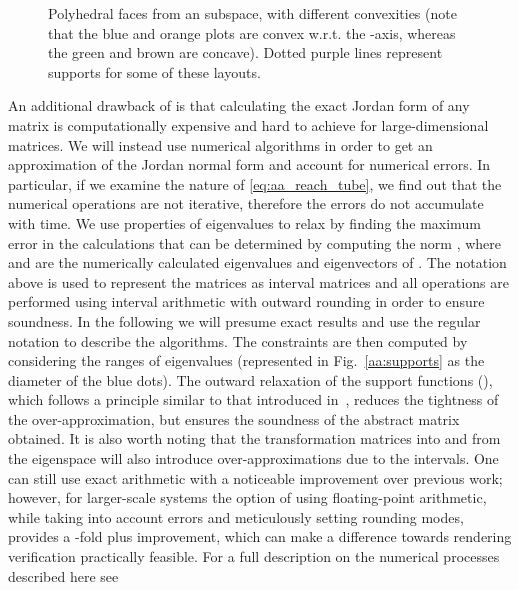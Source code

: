 \documentclass{IEEEtran}
\begin{document}
\begin{figure}[]
\caption{Polyhedral faces from an  subspace, with different convexities  
(note that the blue and orange plots are convex w.r.t. the -axis, whereas the green and brown are concave).
Dotted purple lines represent supports for some of these layouts.}
\label{aa:mixed_supports}
\end{figure}


An additional drawback of \cite{JSS14} is that calculating the exact
Jordan form of any matrix is computationally expensive and hard to
achieve for large-dimensional matrices.  
We will instead use numerical algorithms in
order to get an approximation of the Jordan normal form
and account for numerical errors. In
particular, if we examine the nature of
\eqref{eq:aa_reach_tube}, we find out that the
numerical operations are not iterative, therefore the errors do not
accumulate with time.  We use properties of
eigenvalues to relax  by finding the maximum error in the
calculations that can be determined by computing the norm
,
where  and  are the
numerically calculated eigenvalues and eigenvectors of .
The notation above is used to represent the matrices as interval
matrices and all operations are performed using interval arithmetic
with outward rounding in order to ensure soundness. In the following
we will presume exact results and use the regular notation to describe the algorithms. 
The constraints  are then computed by
considering the ranges of eigenvalues  
(represented in Fig.~\ref{aa:supports} as the diameter of the blue dots).
The outward relaxation of the support functions (), which follows
a principle similar to that introduced in~\cite{gao2012delta}, reduces the
tightness of the over-approximation, but ensures the soundness of the
abstract matrix  obtained. It is also worth noting that
the transformation matrices into and from the eigenspace will also
introduce over-approximations due to the intervals.
One can still use exact arithmetic with a noticeable improvement over
previous work; however, for larger-scale systems the option of using
floating-point arithmetic, while taking into account errors and meticulously
setting rounding modes, provides a -fold plus improvement,
which can make a difference towards rendering verification practically feasible.
For a full description on the numerical processes described here see \cite{cattaruzza2017sound}
\end{document}
